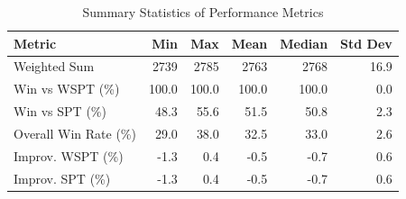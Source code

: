 \begin{table}[htbp]%
\centering%
\begin{tabular}{lrrrrr}%
\toprule%
\textbf{Metric}&\textbf{Min}&\textbf{Max}&\textbf{Mean}&\textbf{Median}&\textbf{Std Dev}\\%
\midrule%
Weighted Sum&2739&2785&2763&2768&16.9\\%
Win vs WSPT (\%)&100.0&100.0&100.0&100.0&0.0\\%
Win vs SPT (\%)&48.3&55.6&51.5&50.8&2.3\\%
Overall Win Rate (\%)&29.0&38.0&32.5&33.0&2.6\\%
Improv. WSPT (\%)&-1.3&0.4&-0.5&-0.7&0.6\\%
Improv. SPT (\%)&-1.3&0.4&-0.5&-0.7&0.6\\%
\bottomrule%
\end{tabular}%
\caption{Summary Statistics of Performance Metrics}%
\label{tab:metrics}%
\end{table}